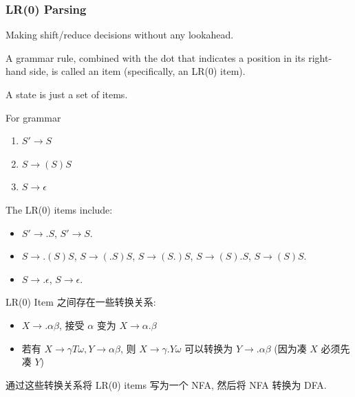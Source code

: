 \subsubsection{LR(0) Parsing}
Making shift/reduce decisions without any lookahead.



\begin{definition}[LR(0) item]
    A grammar rule, combined with the dot that indicates a position in its right-hand side, is called an item (specifically, an LR(0) item).
\end{definition}

A state is just a set of items.

\begin{example}\label{exp:lr0}
    For grammar
    \begin{enumerate}
        \item $S'\to S$
        \item $S\to (S)S$
        \item $S\to \epsilon$
    \end{enumerate}
    The LR(0) items include:
    \begin{itemize}
        \item $S'\to .S$, $S'\to S.$
        \item $S\to .(S)S$, $S\to (.S)S$, $S\to (S.)S$, $S\to (S).S$, $S\to (S)S.$
        \item $S\to .\epsilon$, $S\to \epsilon.$
    \end{itemize}
\end{example}

LR(0) Item  之间存在一些转换关系:
\begin{itemize}
    \item $X\to .\alpha\beta$, 接受 $\alpha$ 变为 $X\to \alpha . \beta$
    \item 若有 $X\to \gamma T\omega, Y\to \alpha\beta$, 则 $X\to \gamma . Y \omega$ 可以转换为 $Y\to .\alpha \beta$ (因为凑 $X$ 必须先凑 $Y$)
\end{itemize}
通过这些转换关系将 LR(0) items 写为一个 NFA, 然后将 NFA 转换为 DFA. 


